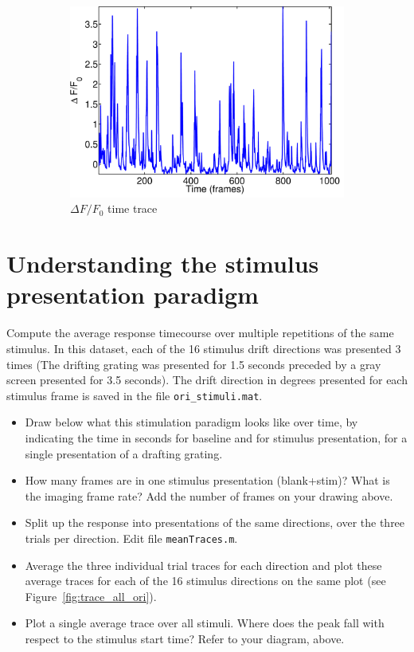 \documentclass[paper=a4, fontsize=11pt]{scrartcl} %
\numberwithin{equation}{section} %
\numberwithin{figure}{section} %
\numberwithin{table}{section} %
\begin{document}
\begin{figure}
\begin{subfigure}[b]{0.3\textwidth}
    \includegraphics[width=\textwidth]{trace_delta_f_f0.pdf}
    \caption{$\Delta F/F_0$ time trace}
    \label{fig:time_trace_dff0}
    \end{subfigure}
    
    \caption{}
\end{figure}

\section{Understanding the stimulus presentation paradigm}
Compute the average response timecourse over multiple repetitions of the same stimulus. In this dataset, each of the 16 stimulus drift directions was presented 3 times (The drifting grating was presented for 1.5 seconds preceded by a gray screen presented for 3.5 seconds). The drift direction in degrees presented for each stimulus frame is saved in the file \texttt{ori\_stimuli.mat}.

\begin{itemize}
\setlength{\parskip}{0.25em}
\item Draw below what this stimulation paradigm looks like over time, by indicating the time in seconds for baseline and for stimulus presentation, for a single presentation of a drafting grating.\vspace{3in}
\item How many frames are in one stimulus presentation (blank+stim)? What is the imaging frame rate? Add the number of frames on your drawing above.
\item Split up the response into presentations of the same directions, over the three trials per direction. Edit file \texttt{meanTraces.m}.
\item Average the three individual trial traces for each direction and plot these average traces for each of the 16 stimulus directions on the same plot (see Figure~\ref{fig:trace_all_ori}).
\item Plot a single average trace over all stimuli. Where does the peak fall with respect to the stimulus start time? Refer to your diagram, above.
\end{itemize}
\end{document}
